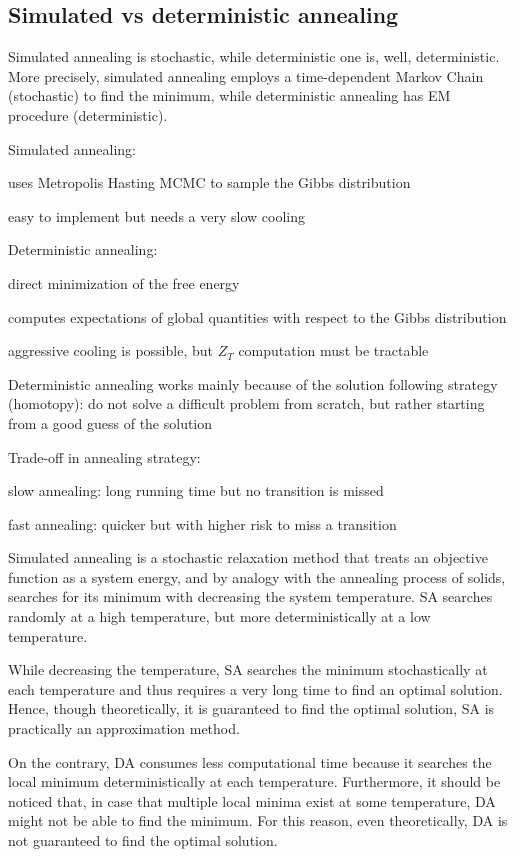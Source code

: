 \documentclass[12pt]{article}
\begin{document}
\subsection{Simulated vs deterministic annealing}
\par Simulated annealing is stochastic, while deterministic one is, well, deterministic. More precisely, simulated annealing employs a time-dependent Markov Chain (stochastic) to find the minimum, while deterministic annealing has EM procedure (deterministic).
\par Simulated annealing:
\ulb
\item uses Metropolis Hasting MCMC to sample the Gibbs distribution
\item easy to implement but needs a very slow cooling
\ule
\par Deterministic annealing:
\ulb
\item direct minimization of the free energy
\item computes expectations of global quantities with respect to the Gibbs distribution
\item aggressive cooling is possible, but $Z_T$ computation must be tractable
\ule
\par Deterministic annealing works mainly because of the solution following strategy (homotopy): do not solve a difficult problem from scratch, but rather starting from a good guess of the solution
\par Trade-off in annealing strategy:
\ulb
\item slow annealing: long running time but no transition is missed
\item fast annealing: quicker but with higher risk to miss a transition
\ule
\par Simulated annealing is a stochastic relaxation method that treats an objective function as a system energy, and by analogy with the annealing process of solids, searches for its minimum with decreasing the system temperature. SA searches randomly at a high temperature, but more deterministically at a low temperature.
\par While decreasing the temperature, SA searches the minimum stochastically at each temperature and thus requires a very long time to find an optimal solution. Hence, though theoretically, it is guaranteed to find the optimal solution, SA is practically an approximation method.
\par On the contrary, DA consumes less computational time because it searches the local minimum deterministically at each temperature. Furthermore, it should be noticed that, in case that multiple local minima exist at some temperature, DA might not be able to find the minimum. For this reason, even theoretically, DA is not guaranteed to find the optimal solution.
\end{document}
